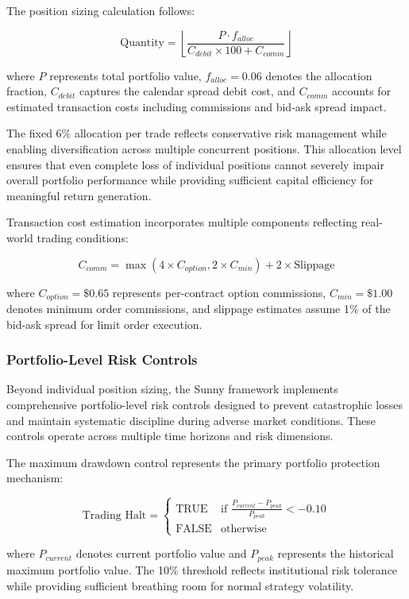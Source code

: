 \documentclass[
  american,
  11pt,
  11pt,
  letterpaper,
  onecolumn]{article}
\begin{document}
The position sizing calculation follows:

\[\text{Quantity} = \left\lfloor \frac{P \cdot f_{alloc}}{C_{debit} \times 100 + C_{comm}} \right\rfloor\]

where \(P\) represents total portfolio value, \(f_{alloc} = 0.06\)
denotes the allocation fraction, \(C_{debit}\) captures the calendar
spread debit cost, and \(C_{comm}\) accounts for estimated transaction
costs including commissions and bid-ask spread impact.

The fixed 6\% allocation per trade reflects conservative risk management
while enabling diversification across multiple concurrent positions.
This allocation level ensures that even complete loss of individual
positions cannot severely impair overall portfolio performance while
providing sufficient capital efficiency for meaningful return
generation.

Transaction cost estimation incorporates multiple components reflecting
real-world trading conditions:

\[C_{comm} = \max(4 \times C_{option}, 2 \times C_{min}) + 2 \times \text{Slippage}\]

where \(C_{option} = \$0.65\) represents per-contract option
commissions, \(C_{min} = \$1.00\) denotes minimum order commissions, and
slippage estimates assume 1\% of the bid-ask spread for limit order
execution.

\subsubsection{Portfolio-Level Risk
Controls}\label{portfolio-level-risk-controls}

Beyond individual position sizing, the Sunny framework implements
comprehensive portfolio-level risk controls designed to prevent
catastrophic losses and maintain systematic discipline during adverse
market conditions. These controls operate across multiple time horizons
and risk dimensions.

The maximum drawdown control represents the primary portfolio protection
mechanism:

\[\text{Trading Halt} = \begin{cases}
\text{TRUE} & \text{if } \frac{P_{current} - P_{peak}}{P_{peak}} < -0.10 \\
\text{FALSE} & \text{otherwise}
\end{cases}\]

where \(P_{current}\) denotes current portfolio value and \(P_{peak}\)
represents the historical maximum portfolio value. The 10\% threshold
reflects institutional risk tolerance while providing sufficient
breathing room for normal strategy volatility.
\end{document}
